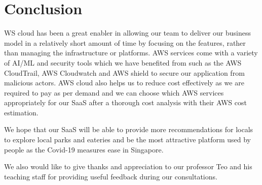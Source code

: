 \documentclass[a4paper]{article}
\begin{document}
\section{Conclusion}

WS cloud has been a great enabler in allowing our team to deliver our business model in a relatively short amount of time by focusing on the features, rather than managing the infrastructure or platforms. AWS services come with a variety of AI/ML and security tools which we have benefited from such as the AWS CloudTrail, AWS Cloudwatch and AWS shield to secure our application from malicious actors. AWS cloud also helps us to reduce cost effectively as we are required to pay as per demand and we can choose which AWS services appropriately for our SaaS after a thorough cost analysis with their AWS cost estimation. 

We hope that our SaaS will be able to provide more recommendations for locals to explore local parks and eateries and be the most attractive platform used by people as the Covid-19 measures ease in Singapore. 

We also would like to give thanks and appreciation to our professor Teo and his teaching staff for providing useful feedback during our consultations.
\end{document}
